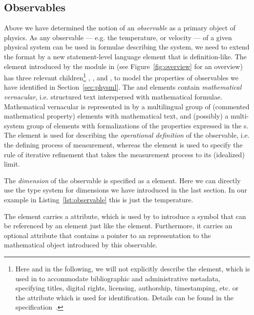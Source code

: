 \subsection{Observables}\label{subsec:observables}

Above we have determined the notion of an {\emph{observable}} as a primary object of
physics. As any observable --- e.g. the temperature, or velocity --- of a given physical
system can be used in formulae describing the system, we need to extend the {\omdoc}
format by a new statement-level language element that is definition-like. The
{} element introduced by the {\physml} module in {\omdoc} (see
Figure~\ref{fig:overview} for an overview) has three relevant children\footnote{Here and
  in the following, we will not explicitly describe the {} element,
  which is used in {\omdoc} to accommodate bibliographic and administrative metadata,
  specifying titles, digital rights, licensing, authorship, timestamping, etc. or the
  {} attribute which is used for identification. Details
  can be found in the {\omdoc} specification~\cite{Kohlhase:omdoc1.2}.} {},
{}, and {}, to model the properties of observables we
have identified in Section~\ref{sec:physml}. The {} and {}
elements contain {\emph{mathematical vernacular}}, i.e. structured text interspersed with
mathematical formulae. Mathematical vernacular is represented in {\omdoc} by a
multilingual group of {} (commented mathematical property) elements with
mathematical text, and (possibly) a multi-system group of {} elements with
formalizations of the properties expressed in the {}s. The {}
element is used for describing the {\emph{operational definition}} of the observable,
i.e. the defining process of measurement, whereas the {} element is
used to specify the rule of iterative refinement that takes the measurement process to
its (idealized) limit.

The {\emph{dimension}} of the observable is specified as a {} element. Here
we can directly use the type system for dimensions we have introduced in the last section.
In our example in Listing~\ref{lst:observable} this is just the temperature.

The {} element carries a {} attribute,
which is used by {\omdoc} to introduce a symbol that can be referenced by an
{} element just like the {} element. Furthermore, it carries
an optional {} attribute that contains a pointer to an
{\omdoc} representation to the mathematical object introduced by this observable.

